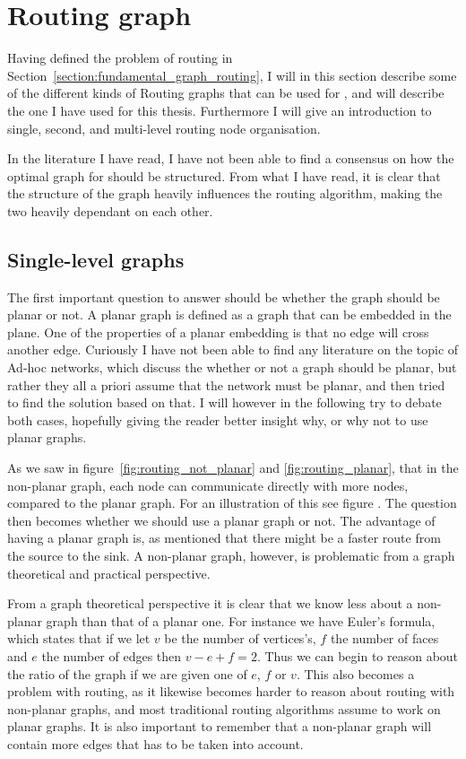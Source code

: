 \section{Routing graph}
\label{section:routing_graph}

Having defined the problem of routing in Section~\ref{section:fundamental_graph_routing}, I will in this section describe some of the different kinds of Routing graphs that can be used for \manet, and will describe the one I have used for this thesis. Furthermore I will give an introduction to single, second, and multi-level routing node organisation. 

In the literature I have read, I have not been able to find a consensus on how the optimal graph for \manet should be structured. From what I have read, it is clear that the structure of the graph heavily influences the routing algorithm, making the two heavily dependant on each other. 

\subsection{Single-level graphs}
\label{single_level}
The first important question to answer should be whether the graph should be planar or not. A planar graph is defined as a graph that can be embedded in the plane. One of the properties of a planar embedding is that no edge will cross another edge.
Curiously I have not been able to find any literature on the topic of Ad-hoc networks, which discuss the whether or not a graph should be planar, but rather they all a priori assume that the network must be planar, and then tried to find the solution based on that. I will however in the following try to debate both cases, hopefully giving the reader better insight why, or why not to use planar graphs.

 As we saw in figure~\ref{fig:routing_not_planar} and \ref{fig:routing_planar}, that in the non-planar graph, each node can communicate directly with more nodes, compared to the planar graph. For an illustration of this see figure . The question then becomes whether we should use a planar graph or not. The advantage of having a planar graph is, as mentioned that there might be a faster route from the source to the sink. A non-planar graph, however, is problematic from a graph theoretical and practical perspective.

From a graph theoretical perspective it is clear that we know less about a non-planar graph than that of a planar one. For instance we have Euler's formula, which states that if we let $v$ be the number of vertices's, $f$ the number of faces and $e$ the number of edges then $v - e + f = 2$. Thus we can begin to reason about the ratio of the graph if we are given one of $e$, $f$ or $v$. This also becomes a problem with routing, as it likewise becomes harder to reason about routing with non-planar graphs, and most traditional routing algorithms assume to work on planar graphs. It is also important to remember that a non-planar graph will contain more edges that has to be taken into account.

